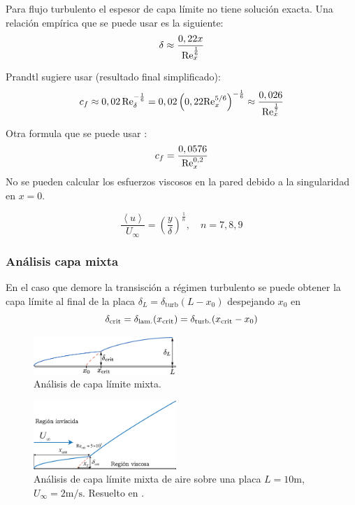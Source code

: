 Para flujo turbulento el espesor de capa límite no tiene solución exacta. Una relación empírica que se puede usar es la siguiente:
\begin{equation}
    \delta \approx \frac{0,22x}{\textrm{Re}_x^{\frac{1}{6}}}
\end{equation}

Prandtl sugiere usar (resultado final simplificado):
\[
c_f \approx 0,02\, \textrm{Re}_\delta^{-\frac{1}{6}} = 0,02\left(0,22 \textrm{Re}_x^{5/6}\right)^{-\frac{1}{6}}\approx \frac{0,026}{\textrm{Re}_x^{\frac{1}{7}}} 
\]

Otra formula que se puede usar \citep{kreith2011principles}:
\begin{equation}
    c_f=\frac{0,0576}{\textrm{Re}_x^{0,2}}
\end{equation}
No se pueden calcular los esfuerzos viscosos en la pared debido a la singularidad en $x=0$.

\[
\frac{\left\langle u \right\rangle}{U_\infty} = \left(\frac{y}{\delta} \right)^{\frac{1}{n}}, \quad n=7,8,9
\]
\subsubsection{Análisis capa mixta}

En el caso que demore la transisción a régimen turbulento se puede obtener la capa límite al final de la placa $\delta_L=\delta_{\mathrm{turb}}(L-x_0)$ despejando $x_0$ en
\[
\delta_{\mathrm{crit}} =\delta_{\mathrm{lam.}}(x_{\mathrm{crit}}) = \delta_{\mathrm{turb.}}(x_{\mathrm{crit}}-x_0) 
\]


\begin{figure}[htb!]
	\centering
	\includegraphics[width=0.48\textwidth]{fig/BLmixed.eps}
	\caption{Análisis de capa límite mixta.}
	\label{fig:BLmixed}
\end{figure}



\begin{figure}[htb!]
    \centering
    \includegraphics[width=0.48\textwidth]{fig/BLmixedejemplo.eps}
    \caption{Análisis de capa límite mixta de aire sobre una placa $L=10\si{\meter}$, $U_\infty=2\si{\meter\per\second}$. Resuelto en \Matlab.}
    \label{fig:BLmixedExample}
\end{figure}


